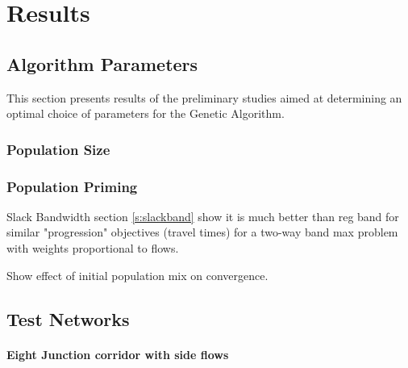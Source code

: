 
\chapter{Results} \label{c:results}

\section{Algorithm Parameters}
This section presents results of the preliminary studies aimed at determining an optimal choice of parameters for the Genetic Algorithm.

\subsection{Population Size}

\subsection{Population Priming} \label{s:poppriming}

Slack Bandwidth section \ref{s:slackband} show it is much better than reg band for similar "progression" objectives (travel times) for a two-way band max problem with weights proportional to flows. 

Show effect of initial population mix on convergence.

\section{Test Networks}

\subsubsection*{Eight Junction corridor with side flows} \label{s:sync8}



